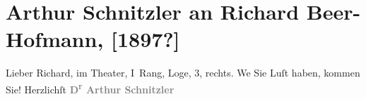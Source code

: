 

         
         \renewcommand{\erwaehntePersonen}{Personen: Richard Beer-Hofmann}
         \renewcommand{\erwaehnteOrte}{Orte: Wien}
         \renewcommand{\erwaehnteWerke}{}
               \section[Arthur Schnitzler an Richard Beer-Hofmann, {[}1897?{]}]{ Arthur Schnitzler an Richard Beer-Hofmann, {[}1897?{]}}\nopagebreak{}\rehead{ }\begin{ledgroupsized}[t]{13cm}\normalsize\beginnumbering{} \toendnotes[C]{\smallbreak\pagebreak[2]} 
\toendnotes[C]{\smallbreak}\pstart
           \noindent{}{\pb}Lieber Richard, \label{K_L00634-1v}\label{K_L00634-1h} im Theater, I Rang, Loge, 3, rechts.\pend
           \pstart
           We{\geminationn} Sie Luſt haben, {\pb}kommen Sie!\pend
           \pstart
           \centering{}Herzlichſt\pend
           \pstart
           \noindent{}\centering{}\textcolor{gray}{\textbf{D\textsuperscript{r} Arthur Schnitzler}}\pend
           
         
         \endnumbering{}\end{ledgroupsized}  \newcommand{\dateiname}{L00634}\newcommand{\titel}{Arthur Schnitzler an Richard Beer-Hofmann, [1897?]}\newcommand{\editorInnen}{Martin Anton Müller und Gerd-Hermann Susen}
      